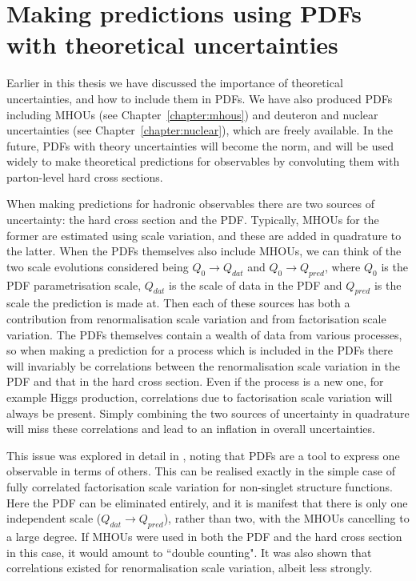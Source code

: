 \chapter{Making predictions using PDFs with theoretical uncertainties}

Earlier in this thesis we have discussed the importance of theoretical uncertainties, and how to include them in PDFs. We have also produced PDFs including MHOUs (see Chapter~\ref{chapter:mhous}) and deuteron and nuclear uncertainties (see Chapter~\ref{chapter:nuclear}), which are freely available. In the future, PDFs with theory uncertainties will become the norm, and will be used widely to make theoretical predictions for observables by convoluting them with parton-level hard cross sections. 

When making predictions for hadronic observables there are two sources of uncertainty: the hard cross section and the PDF. Typically, MHOUs for the former are estimated using scale variation, and these are added in quadrature to the latter. When the PDFs themselves also include MHOUs, we can think of the two scale evolutions considered being $Q_0 \to Q_{dat}$ and $Q_0 \to Q_{pred}$, where $Q_0$ is the PDF parametrisation scale, $Q_{dat}$ is the scale of data in the PDF and $Q_{pred}$ is the scale the prediction is made at. Then each of these sources has both a contribution from renormalisation scale variation and from factorisation scale variation.  The PDFs themselves contain a wealth of data from various processes, so when making a prediction for a process which is included in the PDFs there will invariably be correlations between the renormalisation scale variation in the PDF and that in the hard cross section. Even if the process is a new one, for example Higgs production, correlations due to factorisation scale variation will always be present. Simply combining the two sources of uncertainty in quadrature will miss these correlations and lead to an inflation in overall uncertainties. 

This issue was explored in detail in \cite{Harland-Lang:2018bxd}, noting that PDFs are a tool to express one observable in terms of others. This can be realised exactly in the simple case of fully correlated factorisation scale variation for non-singlet structure functions. Here the PDF can be eliminated entirely, and it is manifest that there is only one independent scale ($Q_{dat} \to Q_{pred}$), rather than two, with the MHOUs cancelling to a large degree. If MHOUs were used in both the PDF and the hard cross section in this case, it would amount to ``double counting". It was also shown that correlations existed for renormalisation scale variation, albeit less strongly.

